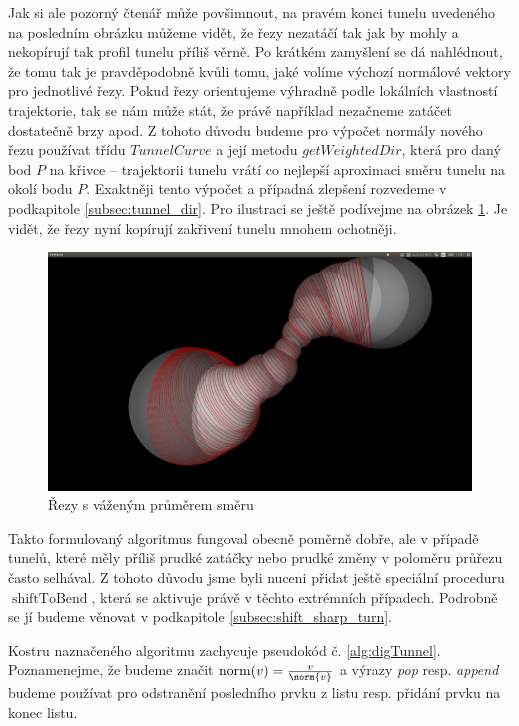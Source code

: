 Jak si ale pozorný čtenář může povšimnout, na pravém konci tunelu uvedeného na
posledním obrázku můžeme vidět, že řezy nezatáčí tak jak by mohly a nekopírují tak
profil tunelu příliš věrně. Po krátkém zamyšlení se dá nahlédnout, že tomu tak
je pravděpodobně kvůli tomu, jaké volíme výchozí normálové vektory pro jednotlivé
řezy. Pokud řezy orientujeme výhradně podle lokálních vlastností trajektorie,
tak se nám může stát, že právě například nezačneme zatáčet dostatečně brzy apod.
Z tohoto důvodu budeme pro výpočet normály nového řezu používat třídu
$ TunnelCurve $ a její metodu $ getWeightedDir $, která pro daný bod $ P $ na křivce
– trajektorii tunelu vrátí co nejlepší aproximaci směru tunelu na okolí bodu $ P $.
Exaktněji tento výpočet a případná zlepšení rozvedeme v podkapitole \ref{subsec:tunnel_dir}.
Pro ilustraci se ještě podívejme na obrázek \ref{fig:weighted_dir}. Je vidět, že
řezy nyní kopírují zakřivení tunelu mnohem ochotněji.

\begin{figure}[ht]
    \centering
    \includegraphics[width=\textwidth]{img/weighted_dir.png}
    \caption{Řezy s váženým průměrem směru}
  \centering
  \label{fig:weighted_dir}
\end{figure}

Takto formulovaný algoritmus fungoval obecně poměrně dobře, ale v případě tunelů,
které měly příliš prudké zatáčky nebo prudké změny v poloměru průřezu často
selhával. Z tohoto důvodu jsme byli nuceni přidat ještě speciální proceduru
$ \operatorname{shiftToBend} $, která se aktivuje právě v těchto extrémních
případech. Podrobně se jí budeme věnovat v podkapitole \ref{subsec:shift_sharp_turn}.

Kostru naznačeného algoritmu zachycuje pseudokód č. \ref{alg:digTunnel}.
Poznamenejme, že budeme značit $ \operatorname{norm}(v) = \frac{v}{\norm{v}}$ a
výrazy \textit{pop} resp. \textit{append} budeme používat pro odstranění posledního prvku z listu resp.
přidání prvku na konec listu.

